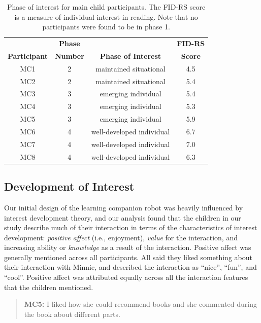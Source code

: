 \documentclass{sigchi}
\begin{document}
\begin{table}[]
	\centering
	\begin{tabular}{cccc}
		& {\small \textbf{Phase}} & & {\small \textbf{FID-RS}} \\
		{\small \textbf{Participant}} & {\small \textbf{Number}}& {\small \textbf{Phase of Interest}}
		& {\small \textbf{Score}} \\
		\midrule		
		MC1  & 2       & maintained situational    & 4.5    \\
		MC2  & 2       & maintained situational    & 5.4    \\
		MC3  & 3       & emerging individual      & 5.4    \\
		MC4  & 3       & emerging individual       & 5.3    \\
		MC5  & 3       & emerging individual       & 5.9    \\
		MC6  & 4       & well-developed individual & 6.7    \\
		MC7  & 4       & well-developed individual & 7.0    \\
		MC8  & 4       & well-developed individual & 6.3   \\
		\midrule     
	\end{tabular}
	\caption{Phase of interest for main child participants. The FID-RS score is a measure of individual interest in reading. Note that no participants were found to be in phase 1.}
	\label{tab:table1}
\end{table}

\subsection{Development of Interest}

Our initial design of the learning companion robot was heavily influenced by interest development theory, and our analysis found that the children in our study describe much of their interaction in terms of the characteristics of interest development: \textit{positive affect} (i.e., enjoyment), \textit{value} for the interaction, and increasing ability or \textit{knowledge} as a result of the interaction. Positive affect was generally mentioned across all participants. All said they liked something about their interaction with Minnie, and described the interaction as ``nice'', ``fun'', and ``cool''. Positive affect was attributed equally across all the interaction features that the children mentioned.
	\begin{quote}
		\textbf{MC5:} I liked how she could recommend books and she commented during the book about different parts.
	\end{quote}
		
\end{document}

